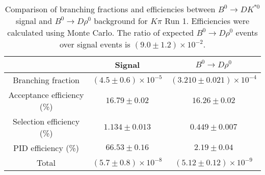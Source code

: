 \begin{table}
    \centering
    \begin{tabular}{ccc}
        \toprule
        & Signal & $B^0 \to D\rho^0$ \\
        \midrule
        Branching fraction & $(4.5 \pm 0.6) \times 10^{-5}$ & $(3.210 \pm 0.021) \times 10^{-4}$ \\
        Acceptance efficiency (\%) & $16.79 \pm 0.02$ & $16.26 \pm 0.02$ \\
        Selection efficiency (\%) & $1.134 \pm 0.013$ & $0.449 \pm 0.007$ \\
        PID efficiency (\%) & $66.53 \pm 0.16$ & $2.19 \pm 0.04$ \\
        \midrule
        Total & $(5.7 \pm 0.8) \times 10^{-8}$ & $(5.12 \pm 0.12) \times 10^{-9}$ \\
        \bottomrule
        \end{tabular}
        \caption{Comparison of branching fractions and efficiencies between $B^0 \to DK^{*0}$ signal and $B^0 \to D\rho^0$ background for $K\pi$ Run 1. Efficiencies were calculated using Monte Carlo. The ratio of expected $B^0 \to D\rho^0$ events over signal events is $(9.0 \pm 1.2) \times 10^{-2}$.}
\label{tab:rho_efficiency_Kpi_run1}
\end{table}
